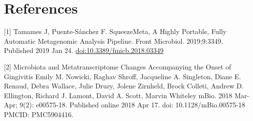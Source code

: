 \documentclass[
]{book}
\begin{document}
\hypertarget{references-1}{%
\section{References}\label{references-1}}

{[}1{]} Tamames J, Puente-Sánchez F. SqueezeMeta, A Highly Portable, Fully Automatic Metagenomic Analysis Pipeline. Front
Microbiol. 2019;9:3349. Published 2019 Jan 24. \url{doi:10.3389/fmicb.2018.03349}

{[}2{]} Microbiota and Metatranscriptome Changes Accompanying the Onset of Gingivitis Emily M. Nowicki, Raghav Shroff, Jacqueline
A. Singleton, Diane E. Renaud, Debra Wallace, Julie Drury, Jolene Zirnheld, Brock Colleti, Andrew D. Ellington,
Richard J. Lamont, David A. Scott, Marvin Whiteley mBio. 2018 Mar-Apr; 9(2): e00575-18. Published online 2018 Apr 17.
doi: 10.1128/mBio.00575-18 PMCID: PMC5904416.

  
\end{document}
